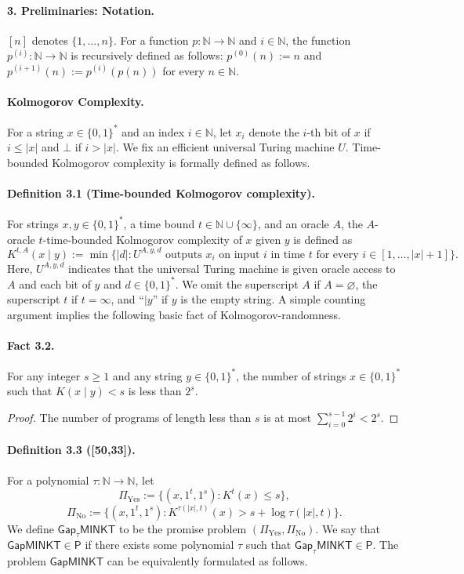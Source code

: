\paragraph{3. Preliminaries: Notation.}
$[n]$ denotes $\{1,\ldots,n\}$. For a function $p:\mathbb N\to\mathbb N$ and $i\in\mathbb N$, the function $p^{(i)}:\mathbb N\to\mathbb N$ is recursively defined as follows: $p^{(0)}(n):=n$ and $p^{(i+1)}(n):=p^{(i)}(p(n))$ for every $n\in\mathbb N$.
\paragraph{Kolmogorov Complexity.}
For a string $x\in\{0,1\}^*$ and an index $i\in\mathbb N$, let $x_i$ denote the $i$-th bit of $x$ if $i\leq|x|$ and $\bot$ if $i>|x|$. We fix an efficient universal Turing machine $U$. Time-bounded Kolmogorov complexity is formally defined as follows.
\paragraph{Definition 3.1 (Time-bounded Kolmogorov complexity).}
For strings $x,y\in\{0,1\}^*$, a time bound $t\in\mathbb N\cup\{\infty\}$, and an oracle $A$, the $A$-oracle $t$-time-bounded Kolmogorov complexity of $x$ given $y$ is defined as
\[K^{t,A}(x\mid y):=\min\{|d|:U^{A,y,d}\text{ outputs }x_i\text{ on input }i\text{ in time }t\text{ for every }i\in[1,\ldots,|x|+1]\}.\]
Here, $U^{A,y,d}$ indicates that the universal Turing machine is given oracle access to $A$ and each bit of $y$ and $d\in\{0,1\}^*$. We omit the superscript $A$ if $A=\varnothing$, the superscript $t$ if $t=\infty$, and ``$\mid y$'' if $y$ is the empty string.
A simple counting argument implies the following basic fact of Kolmogorov-randomness.
\paragraph{Fact 3.2.}
For any integer $s\geq1$ and any string $y\in\{0,1\}^*$, the number of strings $x\in\{0,1\}^*$ such that $K(x\mid y)<s$ is less than $2^s$.
\begin{proof}
The number of programs of length less than $s$ is at most $\sum_{i=0}^{s-1}2^i<2^s$.
\end{proof}
\paragraph{Definition 3.3 ([50,33]).}
For a polynomial $\tau:\mathbb N\to\mathbb N$, let
\[\Pi_{\mathrm{Yes}}:=\{(x,1^t,1^s):K^t(x)\leq s\},\]
\[\Pi_{\mathrm{No}}:=\{(x,1^t,1^s):K^{\tau(|x|,t)}(x)>s+\log\tau(|x|,t)\}.\]
We define $\mathsf{Gap}_{\tau}\mathsf{MINKT}$ to be the promise problem $(\Pi_{\mathrm{Yes}},\Pi_{\mathrm{No}})$. We say that $\mathsf{GapMINKT}\in\mathsf P$ if there exists some polynomial $\tau$ such that $\mathsf{Gap}_{\tau}\mathsf{MINKT}\in\mathsf P$.
The problem $\mathsf{GapMINKT}$ can be equivalently formulated as follows.
